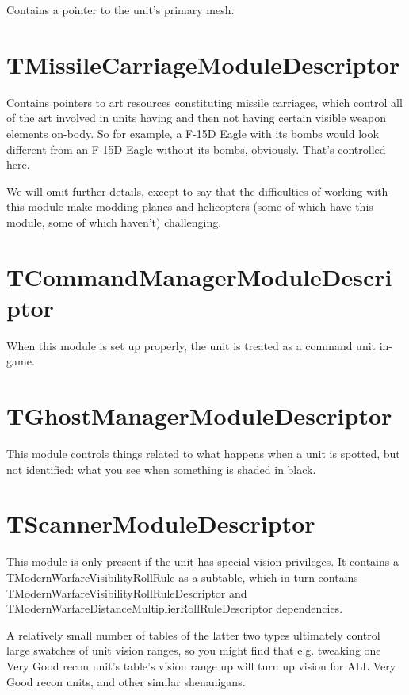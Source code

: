 \documentclass{article}
\begin{document}
Contains a pointer to the unit's primary mesh.

\section{TMissileCarriageModuleDescriptor}

Contains pointers to art resources constituting missile carriages, which control all of the art involved in units having and then not having certain visible weapon elements on-body. So for example, a F-15D Eagle with its bombs would look different from an F-15D Eagle without its bombs, obviously. That's controlled here.

We will omit further details, except to say that the difficulties of working with this module make modding planes and helicopters (some of which have this module, some of which haven't) challenging.

\section{TCommandManagerModuleDescriptor}

When this module is set up properly, the unit is treated as a command unit in-game.

\section{TGhostManagerModuleDescriptor}

This module controls things related to what happens when a unit is spotted, but not identified: what you see when something is shaded in black. 

\section{TScannerModuleDescriptor}

This module is only present if the unit has special vision privileges. It contains a TModernWarfareVisibilityRollRule as a subtable, which in turn contains TModernWarfareVisibilityRollRuleDescriptor and TModernWarfareDistanceMultiplierRollRuleDescriptor dependencies.

A relatively small number of tables of the latter two types ultimately control large swatches of unit vision ranges, so you might find that e.g. tweaking one Very Good recon unit's table's vision range up will turn up vision for ALL Very Good recon units, and other similar shenanigans.
\end{document}
